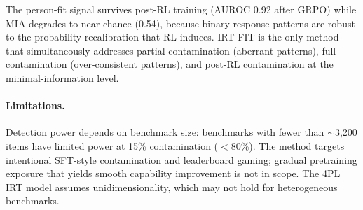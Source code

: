 \documentclass[11pt,a4paper]{article}
\begin{document}
The person-fit signal survives post-RL training (AUROC 0.92 after GRPO) while MIA degrades to near-chance (0.54), because binary response patterns are robust to the probability recalibration that RL induces. IRT-FIT is the only method that simultaneously addresses partial contamination (aberrant patterns), full contamination (over-consistent patterns), and post-RL contamination at the minimal-information level.

\paragraph{Limitations.}
Detection power depends on benchmark size: benchmarks with fewer than $\sim$3{,}200 items have limited power at 15\% contamination ($<$80\%). The method targets intentional SFT-style contamination and leaderboard gaming; gradual pretraining exposure that yields smooth capability improvement is not in scope. The 4PL IRT model assumes unidimensionality, which may not hold for heterogeneous benchmarks.
\end{document}
